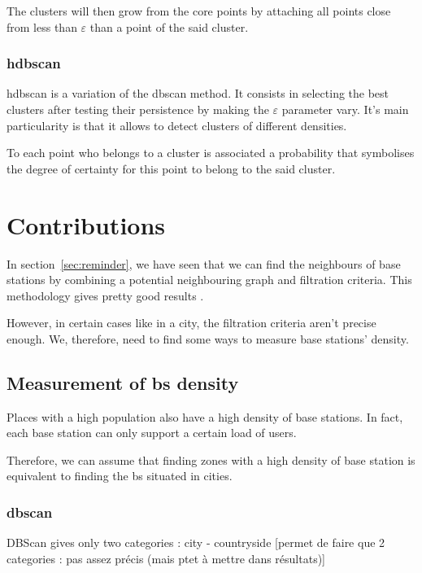 \documentclass[lettersize,journal,english]{IEEEtran}
\begin{document}
            The clusters will then \og grow\fg{} from the core points by attaching all points close from less than \emph{$\varepsilon$} than a point of the said cluster.

        \subsubsection{\acrshort{hdbscan}}
            \acrshort{hdbscan} \cite{10.1007/978-3-642-37456-2_14} is a variation of the \acrshort{dbscan} method.
            It consists in selecting the best clusters after testing their persistence by making the $\varepsilon$ parameter vary. It's main particularity is that it allows to detect clusters of different densities.

            To each point who belongs to a cluster is associated a probability that symbolises the degree of certainty for this point to belong to the said cluster.

\section{Contributions}
    \noindent In section~\ref{sec:reminder}, we have seen that we can find the neighbours of base stations by combining a potential neighbouring graph and filtration criteria. This methodology gives pretty good results \cite{art_del_paq}.

    However, in certain cases like in a city, the filtration criteria aren't precise enough. We, therefore, need to find some ways to measure base stations' density.

    \subsection{Measurement of \acrshort{bs} density}
        Places with a high population also have a high density of base stations. In fact, each base station can only support a certain load of users.

        Therefore, we can assume that finding zones with a high density of base station is equivalent to finding the \acrshort{bs} situated in \og cities\fg{}.

        \subsubsection{\acrshort{dbscan}}
            DBScan gives only two categories : city - countryside
            [permet de faire que 2 categories : pas assez précis (mais ptet à mettre dans résultats)]
\end{document}
